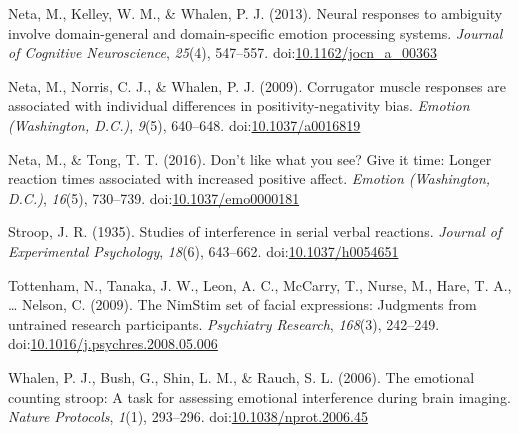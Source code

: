 \documentclass[man]{apa6}
\begin{document}
\leavevmode\hypertarget{ref-neta_neural_2013}{}%
Neta, M., Kelley, W. M., \& Whalen, P. J. (2013). Neural responses to ambiguity involve domain-general and domain-specific emotion processing systems. \emph{Journal of Cognitive Neuroscience}, \emph{25}(4), 547--557. doi:\href{https://doi.org/10.1162/jocn_a_00363}{10.1162/jocn\_a\_00363}

\leavevmode\hypertarget{ref-neta_corrugator_2009}{}%
Neta, M., Norris, C. J., \& Whalen, P. J. (2009). Corrugator muscle responses are associated with individual differences in positivity-negativity bias. \emph{Emotion (Washington, D.C.)}, \emph{9}(5), 640--648. doi:\href{https://doi.org/10.1037/a0016819}{10.1037/a0016819}

\leavevmode\hypertarget{ref-neta_dont_2016}{}%
Neta, M., \& Tong, T. T. (2016). Don't like what you see? Give it time: Longer reaction times associated with increased positive affect. \emph{Emotion (Washington, D.C.)}, \emph{16}(5), 730--739. doi:\href{https://doi.org/10.1037/emo0000181}{10.1037/emo0000181}

\leavevmode\hypertarget{ref-stroop_studies_1935}{}%
Stroop, J. R. (1935). Studies of interference in serial verbal reactions. \emph{Journal of Experimental Psychology}, \emph{18}(6), 643--662. doi:\href{https://doi.org/10.1037/h0054651}{10.1037/h0054651}

\leavevmode\hypertarget{ref-tottenham_nimstim_2009}{}%
Tottenham, N., Tanaka, J. W., Leon, A. C., McCarry, T., Nurse, M., Hare, T. A., \ldots{} Nelson, C. (2009). The NimStim set of facial expressions: Judgments from untrained research participants. \emph{Psychiatry Research}, \emph{168}(3), 242--249. doi:\href{https://doi.org/10.1016/j.psychres.2008.05.006}{10.1016/j.psychres.2008.05.006}

\leavevmode\hypertarget{ref-whalen_emotional_2006}{}%
Whalen, P. J., Bush, G., Shin, L. M., \& Rauch, S. L. (2006). The emotional counting stroop: A task for assessing emotional interference during brain imaging. \emph{Nature Protocols}, \emph{1}(1), 293--296. doi:\href{https://doi.org/10.1038/nprot.2006.45}{10.1038/nprot.2006.45}

\endgroup
\end{document}
